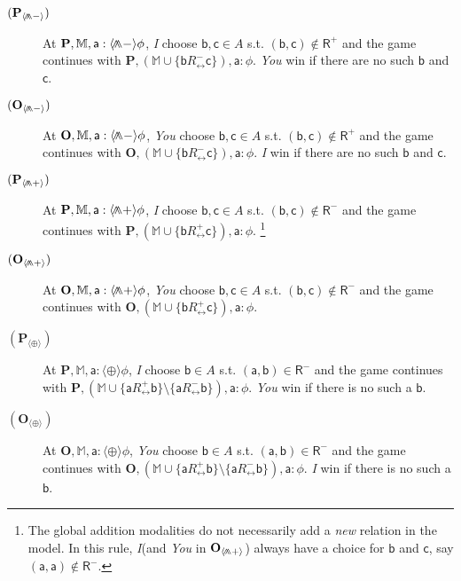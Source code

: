 \documentclass{easychair}
\newcommand{\I}{\emph{I}\xspace}
\newcommand{\You}{\emph{You}\xspace}
\newcommand{\R}{\mathsf{R}}
\newcommand{\ag}{\mathsf{a}}
\renewcommand{\b}{\mathsf{b}}
\renewcommand{\c}{\mathsf{c}}
\newcommand{\pnlP}{\langle \bigdoublewedge+ \rangle }
\newcommand{\pnlN}{\langle\bigdoublewedge-\rangle}
\newcommand{\pnlOP}{\langle\oplus\rangle}
\DeclareMathOperator*{\bigdoublewedge}{\wedge\mkern-15mu\wedge}
\newcommand{\bbM}{\mathbb{M}}
\newcommand{\bfP}{\mathbf{P}}
\newcommand{\bfO}{\mathbf{O}}
\newcommand{\Rinv}{R_{\leftrightarrow}}
\begin{document}
\begin{description}
\item[$(\bfP_{\pnlN})$] At $\mathbf{P}, \bbM,  \ag: \pnlN \phi$, 
     \I choose $\b,\c\in A$ s.t. $(\b,\c)\not\in \R^+$ and the game continues with 
    $\bfP, (\bbM\cup\{\b \Rinv^- \c\}),\ag:  \phi$. \You win if there are no such $\b$ and $\c$. 
\item[$(\bfO_{\pnlN})$] \vspace{-2mm}At $\bfO, \bbM,  \ag: \pnlN \phi$, 
     \You choose $\b,\c\in A$ s.t. $(\b,\c)\not\in \R^+$ and the game continues with 
    $\bfO, (\bbM\cup\{\b \Rinv^- \c\}),\ag:  \phi$. \I win if there are no such $\b$ and $\c$. 
\item[$(\bfP_{\pnlP})$] At $\mathbf{P}, \bbM,  \ag: \pnlP \phi$, \I choose 
     $\b,\c\in A$ s.t. $(\b,\c)\not\in \R^-$  and the game continues with 
    $\bfP, (\bbM\cup\{\b \Rinv^+ \c\}),\ag:  \phi$. \footnote{The global addition modalities do not necessarily add a \emph{new} relation in the model. In
    this rule, \I (and \You in $\bfO_{\pnlP}$) always have a choice for $\b$ and $\c$, say $(\ag,\ag)\notin \R^{-}$.}
\item[$(\bfO_{\pnlP})$] \vspace{-2mm}At $\bfO, \bbM,  \ag: \pnlP \phi$, 
    \You choose $\b,\c\in A$ s.t. $(\b,\c)\not\in \R^-$ and the game continues with 
    $\bfO, (\bbM\cup\{\b \Rinv^+ \c\}),\ag:  \phi$. \item[$(\bfP_{\pnlOP})$] 
    At $\bfP, \bbM,  \ag: \pnlOP \phi$, 
    \I choose $\b\in A$ s.t. $(\ag,\b)\in \R^{-}$ and the game continues with 
    $\bfP, (\bbM\cup\{\ag \Rinv^+ \b\} \setminus\{\ag \Rinv^- \b\}),\ag:  \phi$. 
    \You win if there is no such a $\b$. 
\item[$(\bfO_{\pnlOP})$] 
    \vspace{-2mm}At $\bfO, \bbM,  \ag: \pnlOP \phi$, 
     \You choose $\b\in A$ s.t. $(\ag,\b)\in \R^{-}$ and the game continues with 
    $\bfO, (\bbM\cup\{\ag \Rinv^+ \b\} \setminus\{\ag \Rinv^- \b\}),\ag: \phi$. 
    \I win if there is no such a $\b$. 

\end{description}
\end{document}
